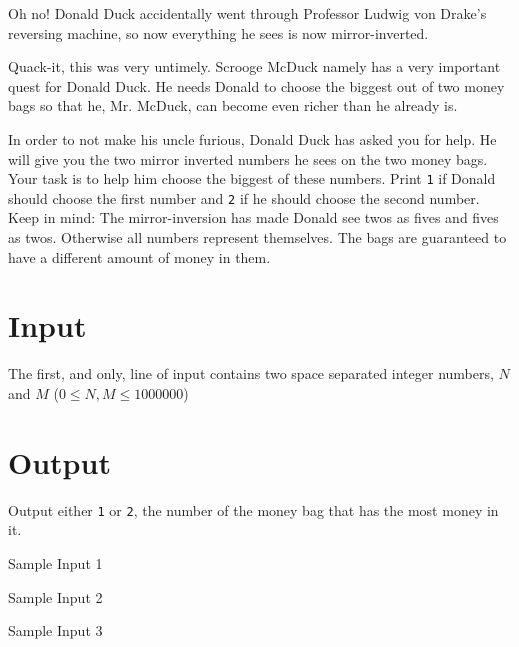 Oh no! Donald Duck accidentally went through Professor Ludwig von Drake’s reversing machine, so now everything he sees is now mirror-inverted.

Quack-it, this was very untimely. Scrooge McDuck namely has a very important quest for Donald Duck. He needs Donald to choose the biggest out of two money bags so that he, Mr. McDuck, can become even richer than he already is.

In order to not make his uncle furious, Donald Duck has asked you for help. He will give you the two
mirror inverted numbers he sees on the two money bags. Your task is to help him choose the biggest
of these numbers. Print \texttt{1} if Donald should choose the first number and \texttt{2} if he should choose the
second number. Keep in mind: The mirror-inversion has made Donald see twos as fives and fives as twos. Otherwise all numbers represent themselves. The bags are guaranteed to have a different amount of money in them.

\section*{Input}
The first, and only, line of input contains two space separated integer numbers, $N$ and $M$ ($0
\leq N, M \leq 1 000 000$)

\section*{Output}
Output either \texttt{1} or \texttt{2}, the number of the money bag that has the most money in it.

\caption{Sample Input 1}

\caption{Sample Input 2}

\caption{Sample Input 3}
